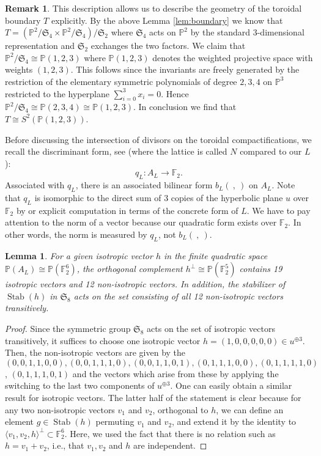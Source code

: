 \documentclass[12pt, pdftex]{amsart}
\theoremstyle{plain}
\newtheorem{lem}[thm]{Lemma}
\theoremstyle{definition}
\newtheorem{rem}[thm]{Remark}
\numberwithin{equation}{section}
\def\P{{\mathbb P}}
\def\SS{{\mathfrak S}}
\def\Stab{\mathop{\mathrm{Stab}}\nolimits}
\def\l{\langle}
\def\r{\rangle}
\begin{document}
\begin{rem}\label{rem:structureT}
This description allows us to describe the geometry of the toroidal boundary $T$ explicitly. By the above Lemma \ref{lem:boundary} we know that
$T=(\P^2/\SS_4 \times \P^2/\SS_4)/\SS_2$ where $\SS_4$ acts on $\P^2$ by the standard $3$-dimensional representation and $\SS_2$ exchanges 
the two factors. 
We claim that $\P^2/\SS_4 \cong \P(1,2,3)$ where $\P(1,2,3)$ denotes the weighted projective space with weights $(1,2,3)$. 
This follows since the invariants are freely generated by the restriction of the elementary symmetric polynomials of degree $2,3,4$ 
on $\P^3$ restricted to the hyperplane $\sum_{i=0}^3 x_i=0$. Hence $\P^2/\SS_4 \cong \P(2,3,4) \cong \P(1,2,3)$. In conclusion we find that $T \cong S^2(\P(1,2,3))$.
\end{rem}


Before discussing the intersection of divisors on the toroidal compactifications, we recall the discriminant form, see \cite[Subsection 2.2]{Ko07a} (where the lattice is called $N$ compared to our $L$):
\[q_L:A_L\to \mathbb{F}_2.\]
Associated with $q_L$, there is an associated bilinear form $b_L(\ ,\ )$ on $A_L$.
Note that $q_L$ is isomorphic to the direct sum of 3 copies of the hyperbolic plane $u$
over $\mathbb{F}_2$ by \cite[Subsection 2.2]{Ko07a} or explicit computation in terms of the concrete form of $L$.
We have to pay attention to the norm of a vector because our quadratic form exists over $\mathbb{F}_2$.
In other words, the norm is measured by $q_L$, not $b_L(\ ,\ )$.
\begin{lem}
\label{lem:finite_quadratic_form}
For a given isotropic vector $h$ in the finite quadratic space $\P(A_L)\cong \P(\mathbb{F}_2^6)$, the orthogonal complement $h^{\perp}\cong\P(\mathbb{F}_2^5)$ contains 19 isotropic vectors and 12 non-isotropic vectors.
In addition, the stabilizer of $\Stab(h)$ in $\SS_8$ acts on the set consisting of all 12 non-isotropic vectors transitively.
\end{lem}
\begin{proof}
Since the symmetric group $\SS_8$ acts on the set of isotropic vectors transitively, it suffices to choose one isotropic vector $h=(1,0,0,0,0,0)\in u^{\oplus 3}$.
Then, the non-isotropic vectors are given by the $(0,0,1,1,0,0), (0,0,1,1,1,0), (0,0,1,1,0,1), (0,1,1,1,0,0), (0,1,1,1,1,0)$, $(0,1,1,1,0,1)$ and the vectors which arise from these by applying the switching to the last two components of $u^{\oplus 3}$.
One can easily obtain a similar result for isotropic vectors.
The latter half of the statement is clear because for any two non-isotropic vectors $v_1$ and $v_2$, orthogonal to $h$, we can define an element $g\in\Stab(h)$ permuting $v_1$ and $v_2$, and extend it by the identity to $\l v_1,v_2,h\r^{\perp}\subset\mathbb{F}_2^6$.
Here, we used the fact that there is no relation such as $h=v_1+v_2$, i.e., that $v_1, v_2$ and $h$ are independent.
\end{proof}
\end{document}
